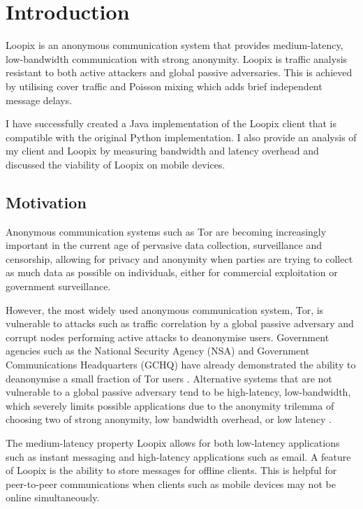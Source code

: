 \documentclass[final,dissertation.tex]{subfiles}
\begin{document}
\chapter{Introduction}

Loopix \cite{piotrowska2017loopix} is an anonymous communication system that provides medium-latency, low-bandwidth communication with strong anonymity. Loopix is traffic analysis resistant to both active attackers and global passive adversaries. This is achieved by utilising cover traffic and Poisson mixing which adds brief independent message delays.

I have successfully created a Java implementation of the Loopix client that is compatible with the original Python implementation. I also provide an analysis of my client and Loopix by measuring bandwidth and latency overhead and discussed the viability of Loopix on mobile devices.

\section{Motivation}

Anonymous communication systems such as Tor \cite{dingledine2004tor} are becoming increasingly important in the current age of pervasive data collection, surveillance and censorship, allowing for privacy and anonymity when parties are trying to collect as much data as possible on individuals, either for commercial exploitation or government surveillance.

However, the most widely used anonymous communication system, Tor, is vulnerable to attacks such as traffic correlation by a global passive adversary and corrupt nodes performing active attacks to deanonymise users. Government agencies such as the National Security Agency (NSA) and Government Communications Headquarters (GCHQ) have already demonstrated the ability to deanonymise a small fraction of Tor users \cite{torstinks}. Alternative systems that are not vulnerable to a global passive adversary tend to be high-latency, low-bandwidth, which severely limits possible applications due to the anonymity trilemma of choosing two of strong anonymity, low bandwidth overhead, or low latency \cite{das2017anonymity}.

The medium-latency property Loopix allows for both low-latency applications such as instant messaging and high-latency applications such as email. A feature of Loopix is the ability to store messages for offline clients. This is helpful for peer-to-peer communications when clients such as mobile devices may not be online simultaneously.
\end{document}
